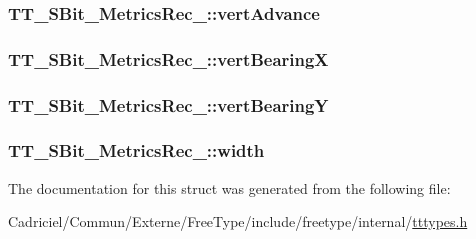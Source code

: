 \hypertarget{struct_t_t___s_bit___metrics_rec___a947468e42759089d0b5c5fa10a0defdf}{
\subsubsection[{vert\-Advance}]{ T\-T\-\_\-\-S\-Bit\-\_\-\-Metrics\-Rec\-\_\-\-::vert\-Advance}}\label{struct_t_t___s_bit___metrics_rec___a947468e42759089d0b5c5fa10a0defdf}
\hypertarget{struct_t_t___s_bit___metrics_rec___a626e67e02494faab653a7543bb0b7c79}{
\subsubsection[{vert\-Bearing\-X}]{ T\-T\-\_\-\-S\-Bit\-\_\-\-Metrics\-Rec\-\_\-\-::vert\-Bearing\-X}}\label{struct_t_t___s_bit___metrics_rec___a626e67e02494faab653a7543bb0b7c79}
\hypertarget{struct_t_t___s_bit___metrics_rec___aef4755ed22ba72e5fa304920bae03146}{
\subsubsection[{vert\-Bearing\-Y}]{ T\-T\-\_\-\-S\-Bit\-\_\-\-Metrics\-Rec\-\_\-\-::vert\-Bearing\-Y}}\label{struct_t_t___s_bit___metrics_rec___aef4755ed22ba72e5fa304920bae03146}
\hypertarget{struct_t_t___s_bit___metrics_rec___a3444618e2c2a612a662a5e0d2c3f25ef}{
\subsubsection[{width}]{ T\-T\-\_\-\-S\-Bit\-\_\-\-Metrics\-Rec\-\_\-\-::width}}\label{struct_t_t___s_bit___metrics_rec___a3444618e2c2a612a662a5e0d2c3f25ef}


The documentation for this struct was generated from the following file\-:\begin{DoxyCompactItemize}
\item 
Cadriciel/\-Commun/\-Externe/\-Free\-Type/include/freetype/internal/\hyperlink{tttypes_8h}{tttypes.\-h}\end{DoxyCompactItemize}
